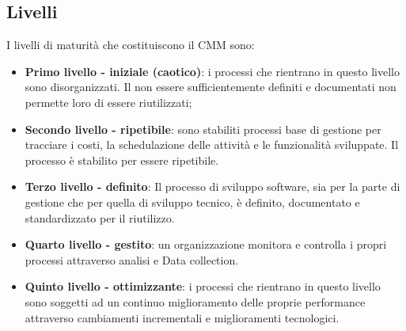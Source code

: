 \documentclass[PdQ.tex]{subfiles}
\begin{document}
	\subsection{Livelli}
	I livelli di maturità che costituiscono il CMM sono:
	\begin{itemize}
		\item \textbf{Primo livello - iniziale (caotico)}: i processi che rientrano in questo livello sono disorganizzati. Il non essere sufficientemente definiti e documentati non permette loro di essere riutilizzati;
		\item \textbf{Secondo livello - ripetibile}:  
		sono stabiliti processi base di gestione per tracciare i costi, la schedulazione delle attività e le funzionalità sviluppate. Il processo è stabilito per essere ripetibile.
		\item \textbf{Terzo livello - definito}: Il processo di sviluppo software, sia per la parte di gestione che per quella di sviluppo tecnico, è definito, documentato e standardizzato per il riutilizzo. 
		\item \textbf{Quarto livello - gestito}: un organizzazione monitora e controlla i propri processi attraverso analisi e Data collection.
		\item \textbf{Quinto livello - ottimizzante}: i processi che rientrano in questo livello sono soggetti ad un continuo miglioramento delle proprie
		performance attraverso cambiamenti incrementali e miglioramenti tecnologici.
	\end{itemize}
\end{document}
